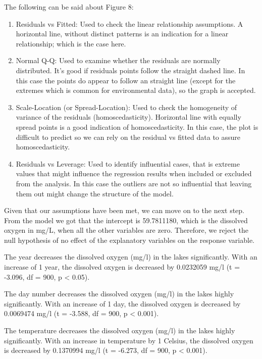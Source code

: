 \documentclass[12pt,]{article}
\begin{document}
The following can be said about Figure 8:

\begin{enumerate}
\def\labelenumi{\arabic{enumi}.}
\item
  Residuals vs Fitted: Used to check the linear relationship
  assumptions. A horizontal line, without distinct patterns is an
  indication for a linear relationship; which is the case here.
\item
  Normal Q-Q: Used to examine whether the residuals are normally
  distributed. It's good if residuals points follow the straight dashed
  line. In this case the points do appear to follow an straight line
  (except for the extremes which is common for environmental data), so
  the graph is accepted.
\item
  Scale-Location (or Spread-Location): Used to check the homogeneity of
  variance of the residuals (homoscedasticity). Horizontal line with
  equally spread points is a good indication of homoscedasticity. In
  this case, the plot is difficult to predict so we can rely on the
  residual vs fitted data to assure homoscedasticity.
\item
  Residuals vs Leverage: Used to identify influential cases, that is
  extreme values that might influence the regression results when
  included or excluded from the analysis. In this case the outliers are
  not so influential that leaving them out might change the structure of
  the model.
\end{enumerate}

Given that our assumptions have been met, we can move on to the next
step. From the model we got that the intercept is 59.7811180, which is
the dissolved oxygen in mg/L, when all the other variables are zero.
Therefore, we reject the null hypothesis of no effect of the explanatory
variables on the response variable.

The year decreases the dissolved oxygen (mg/l) in the lakes
significantly. With an increase of 1 year, the dissolved oxygen is
decreased by 0.0232059 mg/l (t = -3.096, df = 900, p \textless{} 0.05).

The day number decreases the dissolved oxygen (mg/l) in the lakes highly
significantly. With an increase of 1 day, the dissolved oxygen is
decreased by 0.0069474 mg/l (t = -3.588, df = 900, p \textless{} 0.001).

The temperature decreases the dissolved oxygen (mg/l) in the lakes
highly significantly. With an increase in temperature by 1 Celsius, the
dissolved oxygen is decreased by 0.1370994 mg/l (t = -6.273, df = 900, p
\textless{} 0.001).
\end{document}
